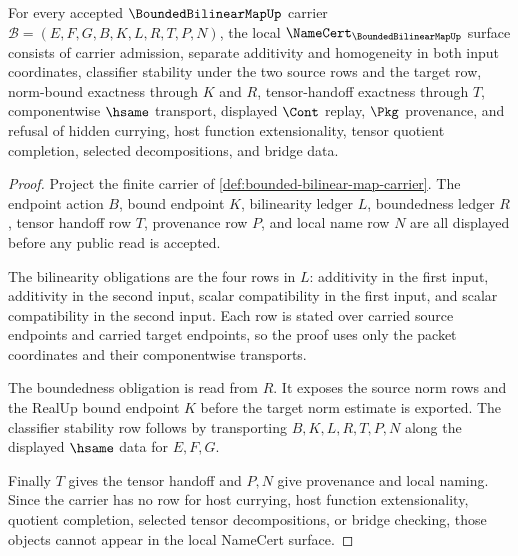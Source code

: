 \begin{theorem}
\label{thm:bounded-bilinear-map-namecert-obligations}
For every accepted $\BoundedBilinearMapUp$ carrier $\mathcal{B}=(E,F,G,B,K,L,R,T,P,N)$, the local $\NameCert_{\BoundedBilinearMapUp}$ surface consists of carrier admission, separate additivity and homogeneity in both input coordinates, classifier stability under the two source rows and the target row, norm-bound exactness through $K$ and $R$, tensor-handoff exactness through $T$, componentwise $\hsame$ transport, displayed $\Cont$ replay, $\Pkg$ provenance, and refusal of hidden currying, host function extensionality, tensor quotient completion, selected decompositions, and bridge data.
\end{theorem}
\begin{proof}
Project the finite carrier of \autoref{def:bounded-bilinear-map-carrier}. The endpoint action $B$, bound endpoint $K$, bilinearity ledger $L$, boundedness ledger $R$, tensor handoff row $T$, provenance row $P$, and local name row $N$ are all displayed before any public read is accepted.

The bilinearity obligations are the four rows in $L$: additivity in the first input, additivity in the second input, scalar compatibility in the first input, and scalar compatibility in the second input. Each row is stated over carried source endpoints and carried target endpoints, so the proof uses only the packet coordinates and their componentwise transports.

The boundedness obligation is read from $R$. It exposes the source norm rows and the RealUp bound endpoint $K$ before the target norm estimate is exported. The classifier stability row follows by transporting $B,K,L,R,T,P,N$ along the displayed $\hsame$ data for $E,F,G$.

Finally $T$ gives the tensor handoff and $P,N$ give provenance and local naming. Since the carrier has no row for host currying, host function extensionality, quotient completion, selected tensor decompositions, or bridge checking, those objects cannot appear in the local NameCert surface.
\end{proof}

